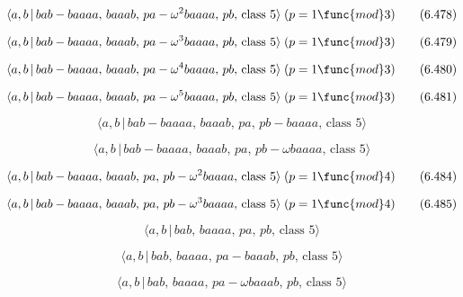 \documentclass[10pt]{article}
\begin{document}
\begin{equation}
\langle a,b\,|\,bab-baaaa,\,baaab,\,pa-\omega ^2baaaa,\,pb,\,\text{class }%
5\rangle\;(p=1 \func{mod} 3)  \tag{6.478}
\end{equation}

\begin{equation}
\langle a,b\,|\,bab-baaaa,\,baaab,\,pa-\omega ^3baaaa,\,pb,\,\text{class }%
5\rangle\;(p=1 \func{mod} 3)  \tag{6.479}
\end{equation}

\begin{equation}
\langle a,b\,|\,bab-baaaa,\,baaab,\,pa-\omega ^4baaaa,\,pb,\,\text{class }%
5\rangle\;(p=1 \func{mod} 3)  \tag{6.480}
\end{equation}

\begin{equation}
\langle a,b\,|\,bab-baaaa,\,baaab,\,pa-\omega ^5baaaa,\,pb,\,\text{class }%
5\rangle\;(p=1 \func{mod} 3)  \tag{6.481}
\end{equation}

\begin{equation}
\langle a,b\,|\,bab-baaaa,\,baaab,\,pa,\,pb-baaaa,\,\text{class }5\rangle 
\tag{6.482}
\end{equation}

\begin{equation}
\langle a,b\,|\,bab-baaaa,\,baaab,\,pa,\,pb-\omega baaaa,\,\text{class }%
5\rangle  \tag{6.483}
\end{equation}

\begin{equation}
\langle a,b\,|\,bab-baaaa,\,baaab,\,pa,\,pb-\omega ^2baaaa,\,\text{class }%
5\rangle\;(p=1 \func{mod} 4)  \tag{6.484}
\end{equation}

\begin{equation}
\langle a,b\,|\,bab-baaaa,\,baaab,\,pa,\,pb-\omega ^3baaaa,\,\text{class }%
5\rangle\;(p=1 \func{mod} 4)  \tag{6.485}
\end{equation}

\begin{equation}
\langle a,b\,|\,bab,\,baaaa,\,pa,\,pb,\,\text{class }5\rangle  \tag{6.486}
\end{equation}

\begin{equation}
\langle a,b\,|\,bab,\,baaaa,\,pa-baaab,\,pb,\,\text{class }5\rangle 
\tag{6.487}
\end{equation}

\begin{equation}
\langle a,b\,|\,bab,\,baaaa,\,pa-\omega baaab,\,pb,\,\text{class }5\rangle 
\tag{6.488}
\end{equation}
\end{document}
